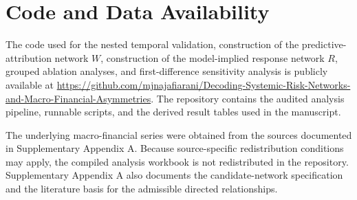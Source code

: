 \section*{Code and Data Availability}

The code used for the nested temporal validation, construction of the predictive-attribution network $W$, construction of the model-implied response network $R$, grouped ablation analyses, and first-difference sensitivity analysis is publicly available at
\url{https://github.com/mjnajafiarani/Decoding-Systemic-Risk-Networks-and-Macro-Financial-Asymmetries}.
The repository contains the audited analysis pipeline, runnable scripts, and the derived result tables used in the manuscript.

The underlying macro-financial series were obtained from the sources documented in Supplementary Appendix A. Because source-specific redistribution conditions may apply, the compiled analysis workbook is not redistributed in the repository. Supplementary Appendix A also documents the candidate-network specification and the literature basis for the admissible directed relationships.
